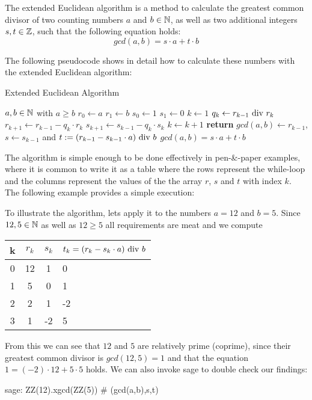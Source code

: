 The extended Euclidean algorithm is a method to calculate the greatest common divisor of two counting numbers $ a $ and $ b \in \mathbb{N} $, as well as two additional integers $ s, t \in \mathbb{Z} $, such that the following equation holds:
\begin{equation}
\label{eq: erw_Eukl_algo}
gcd (a, b) = s \cdot a + t \cdot b
\end{equation}

The following pseudocode shows in detail how to calculate these numbers with the extended Euclidean algorithm:

\begin{algorithm}\caption{Extended Euclidean Algorithm}
\label{alg_ext_euclid_alg}
\begin{algorithmic}[0]
\Require $a,b \in \mathbb{N}$ with $a\geq b$
\State $r_0\gets a$
\State $r_1\gets b$
\State $s_0\gets 1$
\State $s_1\gets 0$
\State $k\gets 1$
\State $ q_k\gets r_{k-1} \text{ div } r_k $
\State $ r_{k + 1}\gets r_{k-1} -q_k \cdot r_k $
\State $ s_{k + 1}\gets s_{k-1} -q_k \cdot s_k $
\State $ k \gets k + 1 $
\EndWhile
\State \textbf{return} $gcd(a,b)\gets r_{k-1}$, $s\gets s_{k-1}$ and $ t: = (r_{k-1}-s_{k-1} \cdot a) \text{ div } b $ 
\EndProcedure
\Ensure $ gcd (a, b) = s \cdot a + t \cdot b $
\end{algorithmic}
\end{algorithm}
The algorithm is simple enough to be done effectively in pen-\&-paper examples, where it is common to write it as a table where the rows represent the while-loop and the columns represent the values of the the array $r$, $s$ and $t$ with index $k$. The following example provides a simple execution:
\begin{example} To illustrate the algorithm, lets apply it to the numbers $a=12$ and $b=5$. Since $12,5\in \mathbb{N}$ as well as $12\geq 5$ all requirements are meat and we compute
\begin{center}
  \begin{tabular}{c | c c l}
    k & $ r_k $ & $ s_k $ & $ t_k = (r_k-s_k \cdot a) \text{ div } b $ \\\hline
    0 & 12 & 1 & 0 \\
    1 & 5 & 0 & 1 \\
    2 & 2 & 1 & -2 \\
    3 & 1 & -2 & 5 \\
  \end{tabular}
\end{center}
From this we can see that $ 12 $ and $ 5 $ are relatively prime (coprime), since their greatest common divisor is $ gcd (12, 5) = 1 $ and that the equation $ 1 = (-2) \cdot 12 + 5 \cdot 5 $ holds. We can also invoke sage to double check our findings:
\begin{sagecommandline}
sage: ZZ(12).xgcd(ZZ(5)) # (gcd(a,b),s,t)
\end{sagecommandline}
\end{example}
